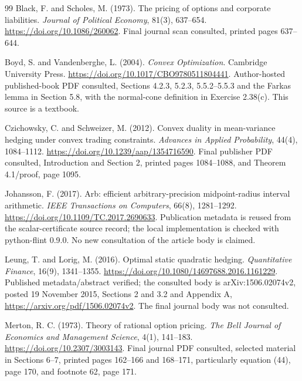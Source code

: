 \documentclass[11pt]{article}
\begin{document}
\begin{thebibliography}{99}
Black, F. and Scholes, M. (1973). The pricing of options and corporate liabilities. \emph{Journal of Political Economy}, 81(3), 637--654. \url{https://doi.org/10.1086/260062}. Final journal scan consulted, printed pages 637--644.

Boyd, S. and Vandenberghe, L. (2004). \emph{Convex Optimization}. Cambridge University Press. \url{https://doi.org/10.1017/CBO9780511804441}. Author-hosted published-book PDF consulted, Sections 4.2.3, 5.2.3, 5.5.2--5.5.3 and the Farkas lemma in Section 5.8, with the normal-cone definition in Exercise 2.38(c). This source is a textbook.

Czichowsky, C. and Schweizer, M. (2012). Convex duality in mean-variance hedging under convex trading constraints. \emph{Advances in Applied Probability}, 44(4), 1084--1112. \url{https://doi.org/10.1239/aap/1354716590}. Final publisher PDF consulted, Introduction and Section 2, printed pages 1084--1088, and Theorem 4.1/proof, page 1095.

Johansson, F. (2017). Arb: efficient arbitrary-precision midpoint-radius interval arithmetic. \emph{IEEE Transactions on Computers}, 66(8), 1281--1292. \url{https://doi.org/10.1109/TC.2017.2690633}. Publication metadata is reused from the scalar-certificate source record; the local implementation is checked with python-flint 0.9.0. No new consultation of the article body is claimed.

Leung, T. and Lorig, M. (2016). Optimal static quadratic hedging. \emph{Quantitative Finance}, 16(9), 1341--1355. \url{https://doi.org/10.1080/14697688.2016.1161229}. Published metadata/abstract verified; the consulted body is arXiv:1506.02074v2, posted 19 November 2015, Sections 2 and 3.2 and Appendix A, \url{https://arxiv.org/pdf/1506.02074v2}. The final journal body was not consulted.

Merton, R. C. (1973). Theory of rational option pricing. \emph{The Bell Journal of Economics and Management Science}, 4(1), 141--183. \url{https://doi.org/10.2307/3003143}. Final journal PDF consulted, selected material in Sections 6--7, printed pages 162--166 and 168--171, particularly equation (44), page 170, and footnote 62, page 171.
\end{thebibliography}
\end{document}
